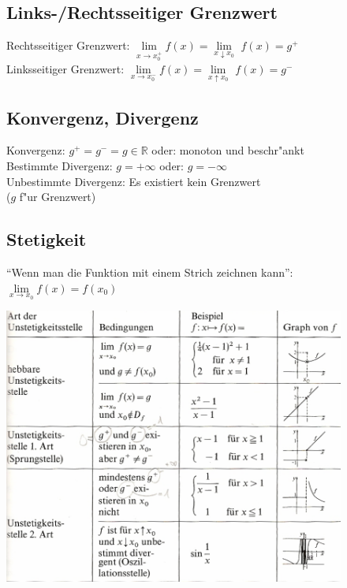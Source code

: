 	\begin{figure}[hct]
		\begin{minipage}[b]{10.4 cm}
			\subsection{Links-/Rechtsseitiger Grenzwert}
				Rechtsseitiger Grenzwert: $\lim\limits_{x \to x_0^+} f(x) = \lim\limits_{x \downarrow x_0}$
				$f(x) = g^+$\\
				Linksseitiger Grenzwert: $\lim\limits_{x \to x_0^-} f(x) = \lim\limits_{x \uparrow x_0}$
				$f(x) = g^-$

			\subsection{Konvergenz, Divergenz}
				Konvergenz: $g^+ = g^- = g \in \mathbb{R}$ oder: monoton und beschr"ankt\\
				Bestimmte Divergenz: $g = +\infty$ oder: $g = -\infty$\\ 
				Unbestimmte Divergenz: Es existiert kein Grenzwert\\
				\small{($g$ f"ur Grenzwert)}

			\subsection{Stetigkeit}
				"`Wenn man die Funktion mit einem Strich zeichnen kann"':\\
				$\lim\limits_{x \to x_0} f(x) = f(x_0)$
  		\end{minipage}
  		\begin{minipage}[b]{8 cm}
    		\includegraphics[width=8 cm]{./bilder/grenzwerte_unstetigkeitsstellen.png}
  		\end{minipage}
	\end{figure}
	
